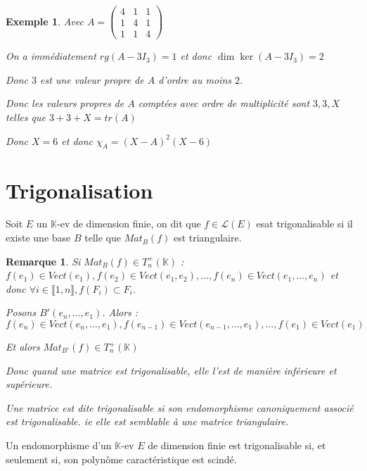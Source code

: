 \documentclass[a4paper,12pt]{book}
\newcommand{\Def}[2]{\begin{tcolorbox}[sharp corners, colback=white,colframe=blue!90!black!75, title=Définition : #1]#2\end{tcolorbox}}
\newcommand{\Thr}[2]{\begin{tcolorbox}[sharp corners, colback=white,colframe=red!90!black!75, title=Théorème : #1]#2\end{tcolorbox}}
\newtheorem{Exe}{Exemple}[section]
\newtheorem{Rem}{Remarque}[section]
\def\K{\mathbb{K}}
\begin{document}
\begin{Exe}
Avec $A=\begin{pmatrix} 4&1&1\\1&4&1\\1&1&4\end{pmatrix}$ \par On a immédiatement $rg(A-3I_3)=1$ et donc $\dim\ker(A-3I_3)=2$ \par Donc $3$ est une valeur propre de $A$ d'ordre au moins $2$. \par Donc les valeurs propres de $A$ comptées avec ordre de multiplicité sont $3,3,X$ telles que $3+3+X=tr(A)$ \par Donc $X=6$ et donc $\chi_A=(X-A)^2(X-6)$
\end{Exe}

\section{Trigonalisation}
\Def{Trigonalisation}{Soit $E$ un $\K$-ev de dimension finie, on dit que $f\in\mathcal{L}(E)$ esat trigonalisable si il existe une base $B$ telle que $Mat_B(f)$ est triangulaire.}
\begin{Rem}
Si $Mat_B(f)\in T_n^+(\K)$ : $f(e_1)\in Vect(e_1), f(e_2)\in Vect(e_1,e_2),..., f(e_n)\in Vect(e_1,...,e_n)$ et donc $\forall i\in\llbracket 1,n\rrbracket, f(F_i)\subset F_i$.
\par Posons $B'(e_n,...,e_1)$. Alors : $f(e_n)\in Vect(e_n,...,e_1), f(e_{n-1})\in Vect(e_{n-1},..., e_1),..., f(e_1)\in Vect(e_1)$
\par Et alors $Mat_{B'}(f)\in T_n^+(\K)$
\par Donc quand une matrice est trigonalisable, elle l'est de manière inférieure et supérieure.
\par Une matrice est dite trigonalisable si son endomorphisme canoniquement associé est trigonalisable. ie elle est semblable à une matrice triangulaire.
\end{Rem}
\Thr{}{Un endomorphisme d'un $\K$-ev $E$ de dimension finie est trigonalisable si, et seulement si, son polynôme caractéristique est scindé.}
\end{document}
